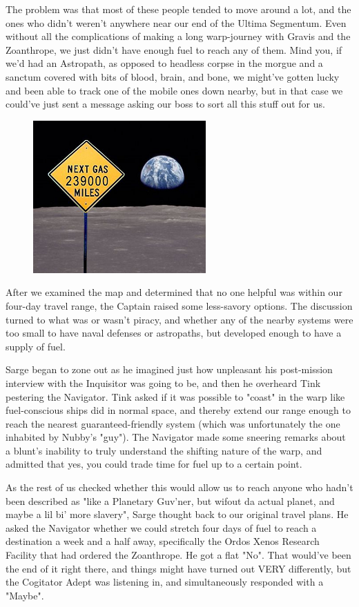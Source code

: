 The problem was that most of these people tended to move around a lot, and the ones who didn't weren't anywhere near our end of the Ultima Segmentum. 
Even without all the complications of making a long warp-journey with Gravis and the Zoanthrope, we just didn't have enough fuel to reach any of them. 
Mind you, if we'd had an Astropath, as opposed to headless corpse in the morgue and a sanctum covered with bits of blood, brain, and bone, we might've gotten lucky and been able to track one of the mobile ones down nearby, but in that case we could've just sent a message asking our boss to sort all this stuff out for us.

\begin{figure}
	\begin{center}
		\includegraphics[width=\figwidth]{pics/15/30.png}
	\end{center}
\end{figure}
After we examined the map and determined that no one helpful was within our four-day travel range, the Captain raised some less-savory options. 
The discussion turned to what was or wasn't piracy, and whether any of the nearby systems were too small to have naval defenses or astropaths, but developed enough to have a supply of fuel. 


Sarge began to zone out as he imagined just how unpleasant his post-mission interview with the Inquisitor was going to be, and then he overheard Tink pestering the Navigator. 
Tink asked if it was possible to "coast" in the warp like fuel-conscious ships did in normal space, and thereby extend our range enough to reach the nearest guaranteed-friendly system (which was unfortunately the one inhabited by Nubby's "guy"). 
The Navigator made some sneering remarks about a blunt's inability to truly understand the shifting nature of the warp, and admitted that yes, you could trade time for fuel up to a certain point. 


As the rest of us checked whether this would allow us to reach anyone who hadn't been described as "like a Planetary Guv'ner, but wifout da actual planet, and maybe a lil bi' more slavery", Sarge thought back to our original travel plans. 
He asked the Navigator whether we could stretch four days of fuel to reach a destination a week and a half away, specifically the Ordos Xenos Research Facility that had ordered the Zoanthrope. 
He got a flat "No". 
That would've been the end of it right there, and things might have turned out VERY differently, but the Cogitator Adept was listening in, and simultaneously responded with a "Maybe".

